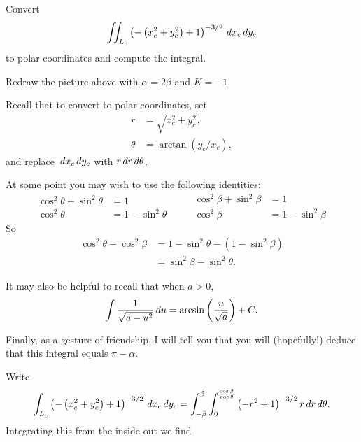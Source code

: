 \documentclass[newpage,hints,12pt,nooutcomes,noauthor]{ximera}
\begin{document}
\begin{problem}
  Convert
  \[
  \iint_{L_c} \left(-\left(x_c^2+y_c^2\right)+1\right)^{-3/2} \,d x_c\,d y_c
  \]
  to polar coordinates and compute the integral.
  \begin{hint}
    Redraw the picture above with $\alpha = 2\beta$ and $K=-1$.
  \end{hint}
  \begin{hint}
    Recall that to convert to polar coordinates, set
    \begin{align*}
      r &= \sqrt{x_c^2+y_c^2},\\
      \theta &= \arctan(y_c/x_c),
    \end{align*}
    and replace $\,d x_c\,d y_c$ with $r\,d r\,d \theta$.
  \end{hint}
  \begin{hint}
    At some point you may wish to use the following identities:
    \[
    \begin{split}
      \cos^2\theta + \sin^2\theta &=1\\
      \cos^2\theta &= 1-\sin^2\theta
    \end{split}
    \qquad
    \begin{split}
      \cos^2\beta + \sin^2\beta &=1\\
      \cos^2\beta &= 1-\sin^2\beta
    \end{split}
    \]
    So
    \begin{align*}
      \cos^2\theta - \cos^2\beta &= 1 - \sin^2\theta - \left(1-\sin^2\beta\right)\\
      &= \sin^2\beta - \sin^2\theta.       
    \end{align*}
  \end{hint}
  \begin{hint}
    It may also be helpful to recall that when $a>0$,
    \[
    \int \frac{1}{\sqrt{a - u^2}} \,d u = \arcsin\left(\frac{u}{\sqrt{a}}\right) + C.
    \]
  \end{hint}
  \begin{hint}
    Finally, as a gesture of friendship, I will tell you that you will
    (hopefully!) deduce that this integral equals $\pi-\alpha$.
  \end{hint}
  \begin{freeResponse}
    Write
    \[
    \int_{L_c} \left(-\left(x_c^2+y_c^2\right)+1\right)^{-3/2} \,d x_c\,d y_c
    = \int_{-\beta}^\beta \int_0^{\frac{\cos \beta}{\cos\theta}}\left(-r^2+1\right)^{-3/2} r\,d r\,d \theta.
    \]
    Integrating this from the inside-out we find
    \begin{align*}

\end{align*}
\end{freeResponse}
\end{problem}
\end{document}
